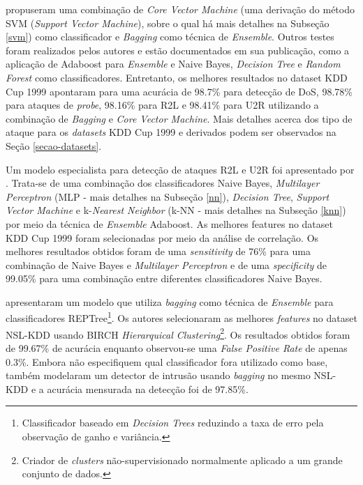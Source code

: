  propuseram uma combinação de \textit{Core Vector Machine} (uma derivação do método SVM (\textit{Support Vector Machine}), sobre o qual há mais detalhes na Subseção \ref{svm}) como classificador e \textit{Bagging} como técnica de \textit{Ensemble}. Outros testes foram realizados pelos autores e estão documentados em sua publicação, como a aplicação de Adaboost para \textit{Ensemble} e Naive Bayes, \textit{Decision Tree} e \textit{Random Forest} como classificadores. Entretanto, os melhores resultados no dataset KDD Cup 1999 apontaram para uma acurácia de 98.7\% para detecção de DoS, 98.78\% para ataques de \textit{probe}, 98.16\% para R2L e 98.41\% para U2R utilizando a combinação de \textit{Bagging} e \textit{Core Vector Machine}. Mais detalhes acerca dos tipo de ataque para os \textit{datasets} KDD Cup 1999 e derivados podem ser observados na Seção \ref{secao-datasets}.


Um modelo especialista para detecção de ataques R2L e U2R foi apresentado por . Trata-se de uma combinação dos classificadores Naive Bayes, \textit{Multilayer Perceptron} (MLP - mais detalhes na Subseção \ref{nn}), \textit{Decision Tree}, \textit{Support Vector Machine} e k-\textit{Nearest Neighbor} (k-NN - mais detalhes na Subseção \ref{knn}) por meio da técnica de \textit{Ensemble} Adaboost. As melhores features no dataset KDD Cup 1999 foram selecionadas por meio da análise de correlação. Os melhores resultados obtidos foram de uma \textit{sensitivity} de 76\% para uma combinação de Naive Bayes e \textit{Multilayer Perceptron} e de uma \textit{specificity} de 99.05\% para uma combinação entre diferentes classificadores Naive Bayes.

 apresentaram um modelo que utiliza \textit{bagging} como técnica de \textit{Ensemble} para classificadores REPTree\footnote{Classificador baseado em \textit{Decision Trees} reduzindo a taxa de erro pela observação de ganho e variância.}. Os autores selecionaram as melhores \textit{features} no dataset NSL-KDD usando BIRCH \textit{Hierarquical Clustering}\footnote{Criador de \textit{clusters} não-supervisionado normalmente aplicado a um grande conjunto de dados.}. Os resultados obtidos foram de 99.67\% de acurácia enquanto observou-se uma \textit{False Positive Rate} de apenas 0.3\%. Embora não especifiquem qual classificador fora utilizado como base,  também modelaram um detector de intrusão usando \textit{bagging} no mesmo NSL-KDD e a acurácia mensurada na detecção foi de 97.85\%. 

